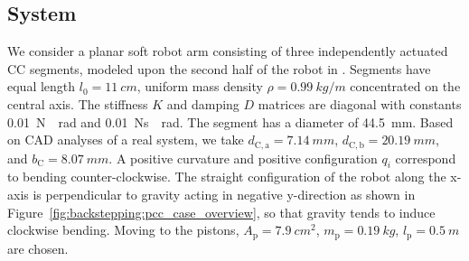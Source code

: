 \subsection{System}
%
We consider a planar soft robot arm consisting of three independently actuated CC segments, modeled upon the second half of the robot in \citep{della2020model}. %
Segments have equal length $l_{0} = \SI{11}{cm}$, uniform mass density $\rho = \SI{0.99}{kg \per m}$ concentrated on the central axis. %
%
The stiffness $K$ and damping $D$ matrices are diagonal with constants \SI{0.01}{N \per rad} and \SI{0.01}{Ns \per rad}. The segment has a diameter of \SI{44.5}{mm}. Based on CAD analyses of a real system, we take $d_{\mathrm{C},\mathrm{a}} = \SI{7.14}{mm}$, $d_{\mathrm{C},\mathrm{b}} = \SI{20.19}{mm}$, and $b_\mathrm{C} = \SI{8.07}{mm}$.
%
A positive curvature and positive configuration $q_i$ correspond to bending counter-clockwise. 
The straight configuration of the robot along the x-axis is perpendicular to gravity acting in negative y-direction as shown in Figure~\ref{fig:backstepping:pcc_case_overview}, so that gravity tends to induce clockwise bending.
%
Moving to the pistons, $A_\mathrm{p} = \SI{7.9}{cm^2}$, $m_\mathrm{p} = \SI{0.19}{kg}$, $l_\mathrm{p} = \SI{0.5}{m}$ are chosen.
